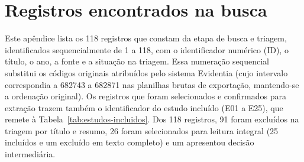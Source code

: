 \chapter{Registros encontrados na busca}
\label{apend:registros}

Este apêndice lista os 118 registros que constam da etapa de busca e triagem, identificados sequencialmente de 1 a 118, com o identificador numérico (ID), o título, o ano, a fonte e a situação na triagem. Essa numeração sequencial substitui os códigos originais atribuídos pelo sistema Evidentia (cujo intervalo correspondia a 682743 a 682871 nas planilhas brutas de exportação, mantendo-se a ordenação original). Os registros que foram selecionados e confirmados para extração trazem também o identificador do estudo incluído (E01 a E25), que remete à Tabela~\ref{tab:estudos-incluidos}. Dos 118 registros, 91 foram excluídos na triagem por título e resumo, 26 foram selecionados para leitura integral (25 incluídos e um excluído em texto completo) e um apresentou decisão intermediária.

